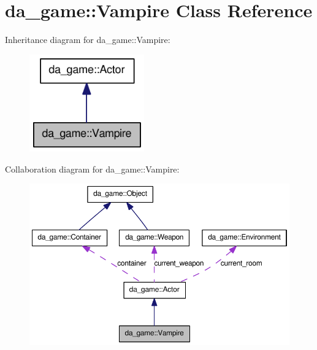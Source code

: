 \hypertarget{classda__game_1_1Vampire}{
\section{da\_\-game::Vampire Class Reference}
\label{classda__game_1_1Vampire}
}
Inheritance diagram for da\_\-game::Vampire:\nopagebreak
\begin{figure}[H]
\begin{center}
\leavevmode
\includegraphics[width=140pt]{classda__game_1_1Vampire__inherit__graph}
\end{center}
\end{figure}
Collaboration diagram for da\_\-game::Vampire:\nopagebreak
\begin{figure}[H]
\begin{center}
\leavevmode
\includegraphics[width=394pt]{classda__game_1_1Vampire__coll__graph}
\end{center}
\end{figure}
